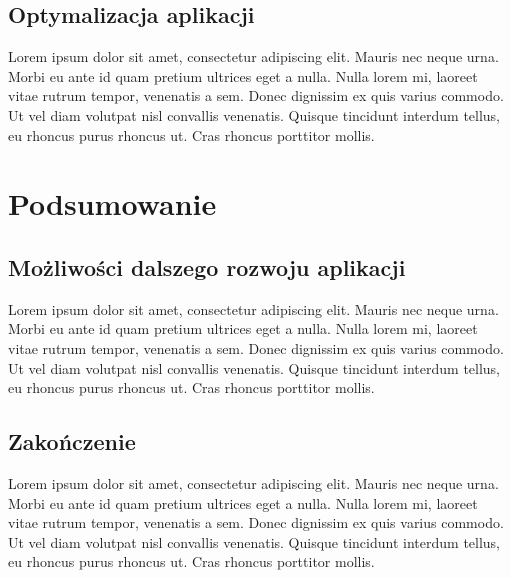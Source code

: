 \documentclass[a4paper,12pt,oneside]{book}
\begin{document}
	\section{Optymalizacja aplikacji}
		Lorem ipsum dolor sit amet, consectetur adipiscing elit. Mauris nec neque urna. Morbi eu ante id quam pretium ultrices eget a nulla. Nulla lorem mi, laoreet vitae rutrum tempor, venenatis a sem. Donec dignissim ex quis varius commodo. Ut vel diam volutpat nisl convallis venenatis. Quisque tincidunt interdum tellus, eu rhoncus purus rhoncus ut. Cras rhoncus porttitor mollis.
	
	\newpage
	\chapter{Podsumowanie}
	\section{Możliwości dalszego rozwoju aplikacji}
	Lorem ipsum dolor sit amet, consectetur adipiscing elit. Mauris nec neque urna. Morbi eu ante id quam pretium ultrices eget a nulla. Nulla lorem mi, laoreet vitae rutrum tempor, venenatis a sem. Donec dignissim ex quis varius commodo. Ut vel diam volutpat nisl convallis venenatis. Quisque tincidunt interdum tellus, eu rhoncus purus rhoncus ut. Cras rhoncus porttitor mollis.
	\section{Zakończenie}
	Lorem ipsum dolor sit amet, consectetur adipiscing elit. Mauris nec neque urna. Morbi eu ante id quam pretium ultrices eget a nulla. Nulla lorem mi, laoreet vitae rutrum tempor, venenatis a sem. Donec dignissim ex quis varius commodo. Ut vel diam volutpat nisl convallis venenatis. Quisque tincidunt interdum tellus, eu rhoncus purus rhoncus ut. Cras rhoncus porttitor mollis.
	
\end{document}
